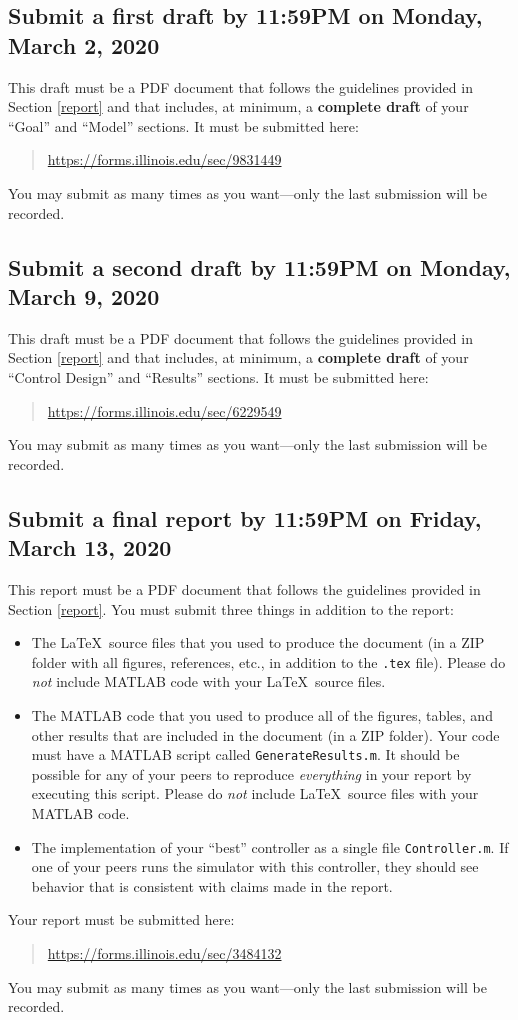 \documentclass[conf]{new-aiaa}
\begin{document}
\subsection{Submit a first draft by 11:59PM on Monday, March 2, 2020}

This draft must be a PDF document that follows the guidelines provided in Section \ref{report} and that includes, at minimum, a {\bf complete draft} of your ``Goal'' and ``Model'' sections. It must be submitted here:
\begin{quote}
\url{https://forms.illinois.edu/sec/9831449}
\end{quote}
You may submit as many times as you want---only the last submission will be recorded.

\subsection{Submit a second draft by 11:59PM on Monday, March 9, 2020}

This draft must be a PDF document that follows the guidelines provided in Section \ref{report} and that includes, at minimum, a {\bf complete draft} of your ``Control Design'' and ``Results'' sections. It must be submitted here:
\begin{quote}
\url{https://forms.illinois.edu/sec/6229549}
\end{quote}
You may submit as many times as you want---only the last submission will be recorded.

\subsection{Submit a final report by 11:59PM on Friday, March 13, 2020}

This report must be a PDF document that follows the guidelines provided in Section \ref{report}. You must submit three things in addition to the report:
\begin{itemize}
\item The \LaTeX\ source files that you used to produce the document (in a ZIP folder with all figures, references, etc., in addition to the \lstinline|.tex| file). Please do {\em not} include MATLAB code with your \LaTeX\ source files.
\item The MATLAB code that you used to produce all of the figures, tables, and other results that are included in the document (in a ZIP folder). Your code must have a MATLAB script called \lstinline|GenerateResults.m|. It should be possible for any of your peers to reproduce {\em everything} in your report by executing this script. Please do {\em not} include \LaTeX\ source files with your MATLAB code.
\item The implementation of your ``best'' controller as a single file \lstinline|Controller.m|. If one of your peers runs the simulator with this controller, they should see behavior that is consistent with claims made in the report.
\end{itemize}
Your report must be submitted here:
\begin{quote}
\url{https://forms.illinois.edu/sec/3484132}
\end{quote}
You may submit as many times as you want---only the last submission will be recorded.
\end{document}
